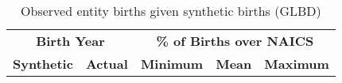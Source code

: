 \begin{table}[H]
\centering\footnotesize
\caption{Observed entity births given synthetic births (GLBD)} \label{tab:GLBD:Probability} \medskip
\renewcommand{\arraystretch}{1}
\begin{tabular}{c c| c c c}
\toprule
\multicolumn{2}{c|}{\textbf{Birth Year}} &  \multicolumn{3}{c}{\textbf{\% of Births over NAICS}}\\
\textbf{Synthetic}&\textbf{Actual}&\textbf{Minimum}&\textbf{Mean}&\textbf{Maximum}\\
\midrule

\bottomrule
\end{tabular} 
\\
\justify
\end{table}

